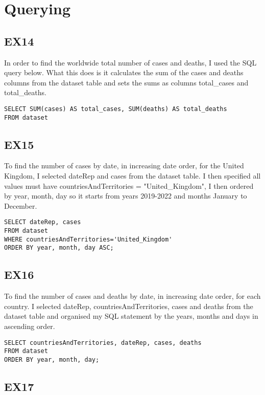 \documentclass[]{article}
\begin{document}
\section{Querying}

\subsection{EX14}

In order to find the worldwide total number of cases and deaths, I used the SQL query below.
What this does is it calculates the sum of the cases and deaths columns from the dataset table and sets the sums as columns total\_cases and total\_deaths.

\begin{lstlisting}
SELECT SUM(cases) AS total_cases, SUM(deaths) AS total_deaths
FROM dataset
\end{lstlisting}

\subsection{EX15}

To find the number of cases by date, in increasing date order, for the United Kingdom, I selected dateRep and cases from the dataset table. I then
specified all values must have countriesAndTerritories = "United\_Kingdom", I then ordered by year, month, day so it starts from years 2019-2022 and months January to December.

\begin{lstlisting}
SELECT dateRep, cases
FROM dataset
WHERE countriesAndTerritories='United_Kingdom'
ORDER BY year, month, day ASC;
\end{lstlisting}

\subsection{EX16}

To find the number of cases and deaths by date, in increasing date order, for each country. I selected dateRep, countriesAndTerritories, cases and deaths
from  the dataset table and organised my SQL statement by the years, months and days in ascending order.

\begin{lstlisting}
SELECT countriesAndTerritories, dateRep, cases, deaths
FROM dataset
ORDER BY year, month, day;
\end{lstlisting}

\subsection{EX17}
\end{document}
